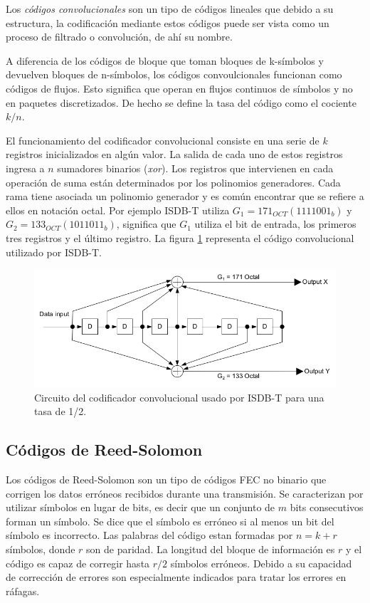 Los \textit{códigos convolucionales} son un tipo de códigos lineales que debido a su estructura, la codificación mediante estos códigos puede ser vista como un proceso de filtrado o convolución, de ahí su nombre. 

A diferencia de los códigos de bloque que toman bloques de k-símbolos y devuelven bloques de n-símbolos, los códigos convoulcionales funcionan como códigos de flujos. Esto significa que operan en flujos continuos de símbolos y no en paquetes discretizados. De hecho se define la tasa del código como el cociente $k/n$.

El funcionamiento del codificador convolucional consiste en una serie de $k$ registros inicializados en algún valor. La salida de cada uno de estos registros ingresa a $n$ sumadores binarios (\textit{xor}). Los registros que intervienen en cada operación de suma están determinados por los polinomios generadores. Cada rama tiene asociada un polinomio generador y es común encontrar que se refiere a ellos en notación octal. Por ejemplo ISDB-T utiliza $G_1 = 171_{OCT} (1111001_b)$ y $G_2 = 133_{OCT} (1011011_b)$, significa que $G_1$ utiliza el bit de entrada, los primeros tres registros y el último registro. La figura \ref{f:cod_conv} representa el código convolucional utilizado por ISDB-T.

\begin{figure}[h!]
	\centering
	\includegraphics[scale=0.45]{figuras/cap02/codificador_convolucional}
	\caption{\label{f:cod_conv} Circuito del codificador convolucional usado por ISDB-T para una tasa de 1/2.}
\end{figure}

\subsection{Códigos de Reed-Solomon}

Los códigos de Reed-Solomon son un tipo de códigos FEC no binario que corrigen los datos erróneos recibidos durante una transmisión. Se caracterizan por utilizar símbolos en lugar de bits, es decir que un conjunto de $m$ bits consecutivos forman un símbolo. Se dice que el símbolo es erróneo si al menos un bit del símbolo es incorrecto. Las palabras del código estan formadas por $n = k +r $ símbolos, donde $r$ son de paridad. La longitud del bloque de información es $r$ y el código es capaz de corregir hasta $r/2$ símbolos erróneos. 
Debido a su capacidad de corrección de errores son especialmente indicados para tratar los errores en ráfagas.



